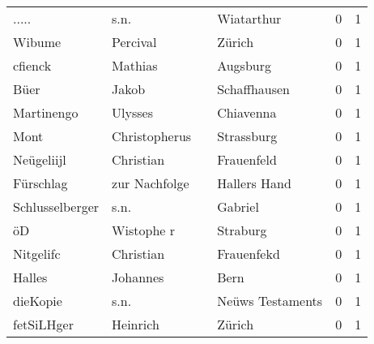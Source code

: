 \begin{center}
\begin{tiny}
\begin{longtabu}{llllrr}
                    ..... &                               s.n. &             &                                  Wiatarthur &          0 &         1 \\
                   Wibume &                           Percival &             &                                      Zürich &          0 &         1 \\
                  cfienck &                            Mathias &             &                                    Augsburg &          0 &         1 \\
                     Büer &                              Jakob &             &                                Schaffhausen &          0 &         1 \\
               Martinengo &                            Ulysses &             &                                   Chiavenna &          0 &         1 \\
                     Mont &                      Christopherus &             &                                  Strassburg &          0 &         1 \\
               Neügeliijl &                          Christian &             &                                  Frauenfeld &          0 &         1 \\
                Fürschlag &                      zur Nachfolge &             &                                Hallers Hand &          0 &         1 \\
          Schlusselberger &                               s.n. &             &                                     Gabriel &          0 &         1 \\
                       öD &                         Wistophe r &             &                                    Straburg &          0 &         1 \\
                Nitgelifc &                          Christian &             &                                  Frauenfekd &          0 &         1 \\
                   Halles &                           Johannes &             &                                        Bern &          0 &         1 \\
                 dieKopie &                               s.n. &             &                            Neüws Testaments &          0 &         1 \\
               fetSiLHger &                           Heinrich &             &                                      Zürich &          0 &         1 \\

\end{longtabu}
\end{tiny}
\end{center}
